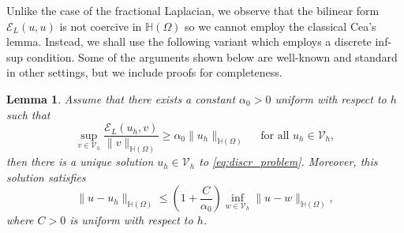 \documentclass[11 pt]{article}
\newtheorem{lemma}[theorem]{Lemma}
\numberwithin{equation}{section}
\def\cE{\mathcal{E}}
\begin{document}
Unlike the case of the fractional Laplacian, we observe that the bilinear form $\cE_{L}(u,u)$ is not coercive in $\mathbb H(\Omega)$ so we cannot employ the classical Cea's lemma. Instead, we shall use the following variant which employs a discrete inf-sup condition. Some of the arguments shown below are well-known and standard in other settings, but we include proofs for completeness.
%
\begin{lemma}\label{lem:cea_mg}
Assume that there exists a constant $\alpha_0>0$ uniform with respect to $h$ such that
%
\begin{equation}\label{eq:discr_inf_sup}
    \sup_{v\in \mathcal V_h}\frac{\cE_{L}(u_h,v)}{\|v\|_{\mathbb H(\Omega)}}\geq \alpha_0\|u_h\|_{\mathbb H(\Omega)} \quad\text{ for all } u_h\in\mathcal V_h,
\end{equation}
%
then there is a unique solution $u_h\in \mathcal V_h$ to \eqref{eq:discr_problem}. Moreover, this solution satisfies
%
\begin{equation}\label{eq:stability_cea}
    \|u-u_h\|_{\mathbb H(\Omega)}\leq \left(1+\frac{C}{\alpha_0}\right)\inf_{w\in\mathcal V_h}\|u-w\|_{\mathbb H(\Omega)},
\end{equation}
%
where $C>0$ is uniform with respect to $h$.
\end{lemma}
%
\end{document}

